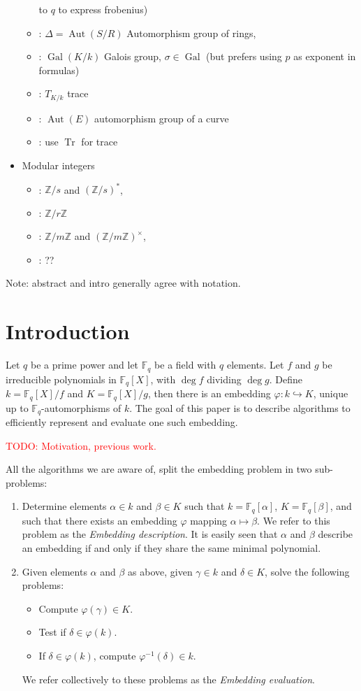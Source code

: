 \documentclass[12pt]{article}
\theoremstyle{plain}
\theoremstyle{definition}
\newcommand{\todo}[1]{\textcolor{red}{TODO: #1}}
\DeclareMathOperator{\trace}{Tr} %
\DeclareMathOperator{\gal}{Gal} %
\DeclareMathOperator{\Aut}{Aut}
\def\Z{\ensuremath{\mathbb{Z}}}
\def\F{\ensuremath{\mathbb{F}}}
\newcounter{algorithm}
\begin{document}
\begin{itemize}
\begin{itemize}
    to $q$ to express frobenius)
  \item \kummer: $\Delta=\Aut(S/R)$ Automorphism group of rings,
  \item \kummer: $\gal(K/k)$ Galois group, $\sigma\in\gal$ (but
    prefers using $p$ as exponent in formulas)
  \item \kummer: $T_{K/k}$ trace
  \item \rains: $\Aut(E)$ automorphism group of a curve
  \item \prop: use $\trace$ for trace
  \end{itemize}
\item Modular integers
  \begin{itemize}
  \item \poster: $\Z/s$ and $(\Z/s)^\ast$,
  \item \kummer: $\Z/r\Z$
  \item \rains: $\Z/m\Z$ and $(\Z/m\Z)^\times$,
  \item \prop: ??
  \end{itemize}
\end{itemize}

Note: abstract and intro generally agree with \poster{} notation.



\section{Introduction}

Let $q$ be a prime power and let $\F_q$ be a field with $q$
elements. Let $f$ and $g$ be irreducible polynomials in $\F_q[X]$,
with $\deg f$ dividing $\deg g$. Define $k=\F_q[X]/f$ and
$K=\F_q[X]/g$,
then there is an embedding $\varphi:k\hookrightarrow
K$, unique up to $\F_q$-automorphisms of $k$. The goal of this paper
is to describe algorithms to efficiently represent and evaluate one
such embedding.

\todo{Motivation, previous work.}

All the algorithms we are aware of, split the embedding problem in two
sub-problems:
\begin{enumerate}
\item Determine elements $\alpha\in k$ and $\beta\in K$ such that
  $k=\F_q[\alpha]$, $K=\F_q[\beta]$, and such that there exists an
  embedding $\varphi$ mapping $\alpha\mapsto\beta$. We refer to this
  problem as the \emph{Embedding description}.
  It is easily seen that $\alpha$ and $\beta$ describe an embedding
  if and only if they share the same minimal polynomial.
\item Given elements $\alpha$ and $\beta$ as above, given $\gamma\in
  k$ and $\delta\in K$, solve the following problems:
  \begin{itemize}
  \item Compute $\varphi(\gamma)\in K$.
  \item Test if $\delta\in\varphi(k)$.
  \item If $\delta\in\varphi(k)$, compute $\varphi^{-1}(\delta)\in k$.
  \end{itemize}
  We refer collectively to these problems as the \emph{Embedding
    evaluation}.
\end{enumerate}
\end{document}
